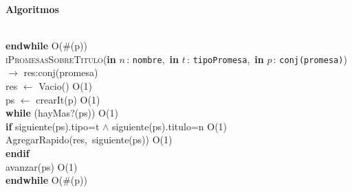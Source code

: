 \documentclass[10pt, a4paper]{article}
\let\NombreFuncion=\textsc
\let\TipoVariable=\texttt
\let\ModificadorArgumento=\textbf
\newcommand{\tab}{\hspace*{7mm}}
\newcommand{\In}[2]{\ModificadorArgumento{in} \ensuremath{#1}\,: \TipoVariable{#2}\xspace}
\newenvironment{Algoritmos}{%
  \vspace*{2ex}%
  \noindent\textbf{\Large Algoritmos}%
  \vspace*{2ex}%
}{}
\begin{document}
\begin{Algoritmos}
\\
\tab \textbf{endwhile} \hfill O($\#$(p))
\\
\NombreFuncion{iPromesasSobreTitulo}(\In{n}{nombre},\ \In{t}{tipoPromesa},\ \In{p}{conj(promesa)}) $\rightarrow$ res:conj(promesa)
\\
\tab res $\leftarrow$ Vacio() \hfill O(1)
\\
\tab ps $\leftarrow$ crearIt(p) \hfill O(1)
\\
\tab \textbf{while} (hayMas?(ps)) \hfill O(1)
\\
\tab \tab \textbf{if} siguiente(ps).tipo=t $\wedge$ siguiente(ps).titulo=n \hfill O(1)
\\
\tab \tab \tab AgregarRapido(res,\ siguiente(ps)) \hfill O(1)
\\
\tab \tab \textbf{endif}
\\
\tab \tab avanzar(ps) \hfill O(1)
\\
\tab \textbf{endwhile} \hfill O($\#$(p))
\\
\end{Algoritmos}
\end{document}
